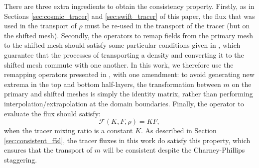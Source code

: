 \documentclass[11pt,a4paper]{article}
\begin{document}
There are three extra ingredients to obtain the consistency property.
Firstly, as in Sections \ref{sec:cosmic_tracer} and \ref{sec:swift_tracer} of this paper, the flux that was used in the transport of $\rho$ must be re-used in the transport of the tracer (but on the shifted mesh).
Secondly, the operators to remap fields from the primary mesh to the shifted mesh should satisfy some particular conditions given in \citet{bendall2023solution}, which guarantee that the processes of transporting a density and converting it to the shifted mesh commute with one another.
In this work, we therefore use the remapping operators presented in \citet{bendall2023solution}, with one amendment: to avoid generating new extrema in the top and bottom half-layers, the transformation between $m$ on the primary and shifted meshes is simply the identity matrix, rather than performing interpolation/extrapolation at the domain boundaries.
Finally, the operator to evaluate the flux should satisfy:
\begin{equation}
\mathcal{F}(K,F,\rho) = KF,
\end{equation}
when the tracer mixing ratio is a constant $K$.
As described in Section \ref{sec:consistent_ffsl}, the tracer fluxes in this work do satisfy this property, which ensures that the transport of $m$ will be consistent despite the Charney-Phillips staggering.
\end{document}
